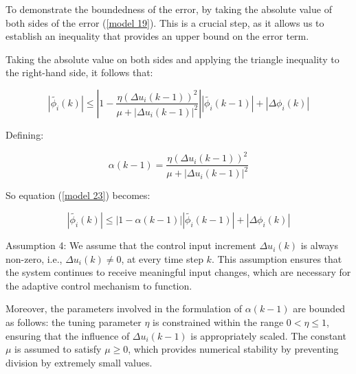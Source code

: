 \documentclass[journal,onecolumn]{IEEEtran}
\begin{document}


To demonstrate the boundedness of the error, by taking the absolute value of both sides of the error (\ref{model 19}). This is a crucial step, as it allows us to establish an inequality that provides an upper bound on the error term.

Taking the absolute value on both sides and applying the triangle inequality to the right-hand side, it follows that:

\begin{equation}
\label{model 20}
|\tilde{\phi_i}(k)| \leq \left| 1 - \frac{\eta (\Delta u_i(k-1))^2}{\mu + |\Delta u_i(k-1)|^2} \right| |\tilde{\phi_i}(k-1)| + |\Delta \phi_i(k)|
\end{equation}

Defining:

\begin{equation}
\label{model 21}
\alpha(k-1) = \frac{\eta (\Delta u_i(k-1))^2}{\mu + |\Delta u_i(k-1)|^2}
\end{equation}

So equation (\ref{model 23}) becomes:

\begin{equation}
\label{model 22}
|\tilde{\phi_i}(k)| \leq |1 - \alpha(k-1)| |\tilde{\phi_i}(k-1)| + |\Delta \phi_i(k)|
\end{equation}



Assumption 4: We assume that the control input increment \(\Delta u_i(k)\) is always non-zero, i.e., \(\Delta u_i(k) \neq 0\), at every time step \(k\). This assumption ensures that the system continues to receive meaningful input changes, which are necessary for the adaptive control mechanism to function. 

Moreover, the parameters involved in the formulation of \(\alpha(k-1)\) are bounded as follows: the tuning parameter \(\eta\) is constrained within the range \(0 < \eta \leq 1\), ensuring that the influence of \(\Delta u_i(k-1)\) is appropriately scaled. The constant \(\mu\) is assumed to satisfy \(\mu \geq 0\), which provides numerical stability by preventing division by extremely small values. 
\end{document}
